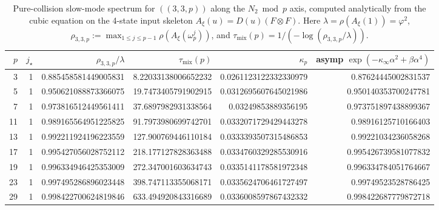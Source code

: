 \begin{table}[H]
\centering
\scriptsize
\setlength{\tabcolsep}{6pt}
\caption{Pure-collision slow-mode spectrum for $((3,3,p))$ along the $N_2\bmod p$ axis, computed analytically from the cubic equation on the 4-state input skeleton $A_\xi(u)=D(u)(F\otimes F)$. Here $\lambda=\rho(A_\xi(1))=\varphi^2$, $\rho_{3,3,p}:=\max_{1\le j\le p-1}\rho(A_\xi(\omega_p^j))$, and $\tau_{\mathrm{mix}}(p)=1/(-\log(\rho_{3,3,p}/\lambda))$.}
\label{tab:arity_pure_collision_cubic_primes}
\begin{tabular}{r r r r r r}
\toprule
$p$ & $j_\star$ & $\rho_{3,3,p}/\lambda$ & $\tau_{\mathrm{mix}}(p)$ & $\kappa_p$ & asymp $\exp(-\kappa_\infty\alpha^2+\beta\alpha^4)$\\
\midrule
3 & 1 & 0.885458581449005831 & 8.22033138006652232 & 0.0261123122332330979 & 0.87624445002831537\\
5 & 1 & 0.950621088873366075 & 19.7473405791902915 & 0.0312695607645021986 & 0.950140353700247781\\
7 & 1 & 0.973816512449561411 & 37.6897982931338564 & 0.03249853889356195 & 0.973751897438899367\\
11 & 1 & 0.989165564951225825 & 91.7973980699742701 & 0.0332071729429443278 & 0.98916125710166403\\
13 & 1 & 0.992211924196223559 & 127.900769446110184 & 0.0333393507315486853 & 0.99221034236058268\\
17 & 1 & 0.995427056028752112 & 218.177127828363488 & 0.0334760329285530916 & 0.995426739581077832\\
19 & 1 & 0.996334946425353009 & 272.347001603634743 & 0.0335141178581972348 & 0.996334784051764667\\
23 & 1 & 0.997495286896023448 & 398.747113355068171 & 0.0335624706461727497 & 0.99749523528786425\\
29 & 1 & 0.998422700624819846 & 633.494920843316689 & 0.0336008597867432332 & 0.998422687779872718\\
\bottomrule
\end{tabular}
\end{table}
